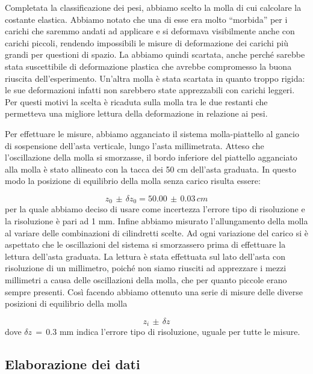 Completata la classificazione dei pesi, abbiamo scelto la molla di cui calcolare la
costante elastica. Abbiamo notato che una di esse era molto ``morbida'' per i carichi che saremmo
andati ad applicare e si deformava visibilmente anche con carichi piccoli, rendendo impossibili
le misure di deformazione dei carichi più grandi per questioni di spazio.
La abbiamo quindi scartata, anche perché sarebbe stata suscettibile di deformazione
plastica che avrebbe compromesso la buona riuscita dell'esperimento.
Un'altra molla è stata scartata in quanto troppo rigida: le sue deformazioni infatti non sarebbero state apprezzabili con carichi leggeri. Per questi motivi la scelta è ricaduta sulla molla tra 
le due restanti che permetteva una migliore lettura della deformazione in relazione ai pesi.

Per effettuare le misure, abbiamo agganciato il sistema molla-piattello al gancio di sospensione dell'asta verticale, lungo l'asta millimetrata. Atteso che l'oscillazione della molla si smorzasse, il bordo inferiore del piattello agganciato alla molla è stato allineato con la tacca dei 50 cm dell'asta graduata. In questo modo la posizione di equilibrio della molla senza carico risulta essere:

\begin{equation*}
	z_0\,\pm\,\delta z_0 = 50.00\,\pm\,0.03\,cm
\end{equation*}
%
per la quale abbiamo deciso di usare come incertezza l'errore tipo di risoluzione e la risoluzione è pari ad 1 mm.
Infine abbiamo misurato l'allungamento della molla al variare delle combinazioni di cilindretti scelte. Ad ogni variazione del carico si è aspettato che le oscillazioni del sistema si smorzassero prima di effettuare la lettura dell'asta graduata. La lettura è stata effettuata sul lato dell'asta con risoluzione di un millimetro, poiché non siamo riusciti ad apprezzare i mezzi millimetri a causa delle oscillazioni della molla, che per quanto piccole erano sempre presenti. Così facendo abbiamo ottenuto una serie di misure delle diverse posizioni di equilibrio della molla

\begin{equation*}
	z_i\,\pm\,\delta z
\end{equation*}
%
dove $\delta z \,=\, 0.3$ mm indica l'errore tipo di risoluzione, uguale per tutte le misure.

\subsection{Elaborazione dei dati}

